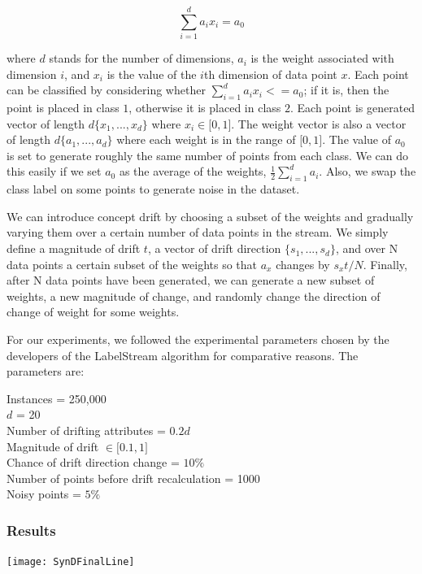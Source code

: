 \documentclass[12pt,a4paper,oneside]{report}
\begin{document}
\[  \sum_{i = 1}^d a_i x_i = a_0 \]

where \(d\) stands for the number of dimensions, \( a_i \) is the weight associated with dimension \(i\),  and \(x_i\) is the value of the \(i\)th dimension of data point \(x\). Each point can be classified by considering whether  \(  \sum_{i = 1}^d a_i x_i <= a_0 \); if it is, then the point is placed in class \(1\), otherwise it is placed in class \(2\). Each point is generated vector of length \( d  \lbrace x_1,...,x_d  \rbrace \) where \( x_i  \in \lbrack  0,1 \rbrack \).  The weight vector is also a vector of length \( d  \lbrace a_1,...,a_d  \rbrace \) where each weight is in the range of \( \lbrack 0,1 \rbrack \).  The value of \( a_0 \) is set to generate roughly the same number of points from each class. We can do this easily if we set \(a_0\) as the average of the weights, \( \frac{1}{2} \sum_{i=1}^d a_i\). Also, we swap the class label on some points to generate noise in the dataset. 

We can introduce concept drift by choosing a subset of the weights and gradually varying them over a certain number of data points in the stream. We simply define a magnitude of drift \(t\), a vector of drift direction  \( \lbrace s_1,...,s_d  \rbrace \), and over N data points a certain subset of the weights so that \( a_x \) changes by \(  s_xt / N \). Finally, after N data points have been generated, we can generate a new subset of weights, a new magnitude of change, and randomly change the direction of change of weight for some weights.

For our experiments, we followed the experimental parameters chosen by the developers of the LabelStream algorithm for comparative reasons. The parameters are:

Instances = 250,000\\
\(d\) = 20 \\
Number of drifting attributes = \(0.2d\)\\
Magnitude of drift \(\in \lbrack 0.1,1\rbrack \) \\
Chance of drift direction change = \(10 \% \) \\
Number of points before drift recalculation  = 1000\\
Noisy points = \(5\% \)
\subsubsection*{Results}

\texttt{[image: SynDFinalLine]}
\end{document}
